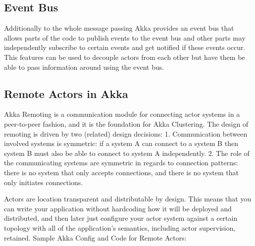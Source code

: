   \subsection{Event Bus}
  Additionally to the whole message passing Akka provides an event bus that allows parts of the code to publish events to the event bus and other parts may independently subscribe to certain events and get notified if these events occur.
  This features can be used to decouple actors from each other but have them be able to pass information around using the event bus.

  \subsection{Remote Actors in Akka}
  Akka Remoting is a communication module for connecting actor systems in a peer-to-peer fashion, and it is the foundation for Akka Clustering. The design of remoting is driven by two (related) design decisions:
  1. Communication between involved systems is symmetric: if a system A can connect to a system B then system B must also be able to connect to system A independently.
  2. The role of the communicating systems are symmetric in regards to connection patterns: there is no system that only accepts connections, and there is no system that only initiates connections.~\parencite{akkaJavaDoc}

Actors are location transparent and distributable by design. This means that you can write your application without hardcoding how it will be deployed and distributed, and then later just configure your actor system against a certain topology with all of the application’s semantics, including actor supervision, retained.
Sample Akka Config and Code for Remote Actors: ~\parencite{akkaHome}

